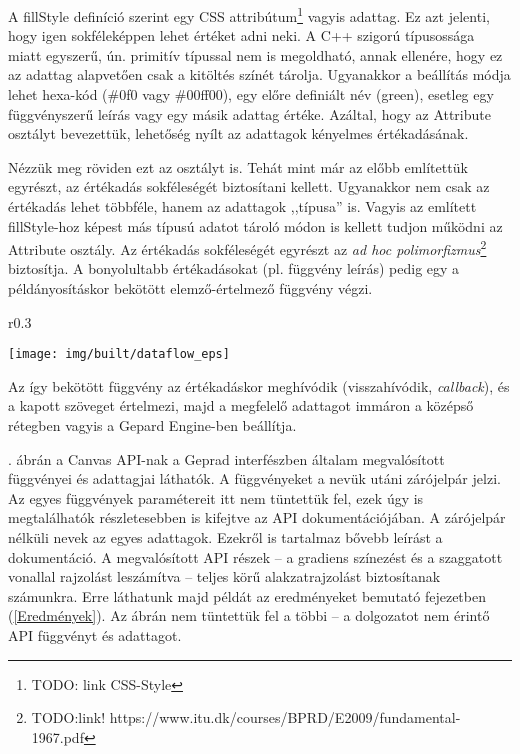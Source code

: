 \documentclass[12pt]{report}
\theoremstyle{definition}
\newcommand{\inenglish}[1]{\textsl{#1}}
\newcommand{\func}[1]{{\textsf{\footnotesize{#1}}}}
\newcommand{\melyikoldalra}{r}
\begin{document}
A \func{fillStyle} definíció szerint egy CSS attribútum\footnote{TODO: link
CSS-Style} vagyis adattag. Ez azt jelenti, hogy igen sokféleképpen lehet
értéket adni neki. A C++ szigorú típusossága miatt egyszerű, ún. primitív
típussal nem is megoldható, annak ellenére, hogy ez az adattag alapvetően csak
a kitöltés színét tárolja. Ugyanakkor a beállítás módja lehet hexa-kód
(\func{\#0f0} vagy \func{\#00ff00}), egy előre definiált név (\func{green}),
esetleg egy függvényszerű leírás vagy egy másik adattag értéke. Azáltal, hogy
az \func{Attribute} osztályt bevezettük, lehetőség nyílt az adattagok kényelmes
értékadásának.

Nézzük meg röviden ezt az osztályt is. Tehát mint már az előbb említettük
egyrészt, az értékadás sokféleségét biztosítani kellett. Ugyanakkor nem csak az
értékadás lehet többféle, hanem az adattagok ,,típusa'' is. Vagyis az említett
\func{fillStyle}-hoz képest más típusú adatot tároló módon is kellett tudjon
működni az \func{Attribute} osztály. Az értékadás sokféleségét egyrészt az
\emph{ad hoc polimorfizmus}\footnote{TODO:link!
https://www.itu.dk/courses/BPRD/E2009/fundamental-1967.pdf} biztosítja. A
bonyolultabb értékadásokat (pl. függvény leírás) pedig egy a példányosításkor
bekötött elemző-értelmező függvény végzi.
  \begin{wrapfigure}{\melyikoldalra}{0.3\textwidth}
  \begin{center}
    \texttt{[image: img/built/dataflow\_eps]}
  \end{center}
    \caption{\label{dataflow-API-diagram} A \emph{felső} réteg, vagyis
    a Gepard interfész függvényei és adattagjai}
  \end{wrapfigure}
Az így bekötött függvény az értékadáskor meghívódik (visszahívódik,
\inenglish{callback}), és a kapott szöveget értelmezi, majd a megfelelő
adattagot immáron a középső rétegben vagyis a \func{Gepard Engine}-ben
beállítja.

. ábrán a Canvas API-nak a Geprad interfészben
általam megvalósított függvényei és adattagjai láthatók. A függvényeket a nevük
utáni zárójelpár jelzi. Az egyes függvények paramétereit itt nem tüntettük fel,
ezek úgy is megtalálhatók részletesebben is kifejtve az API dokumentációjában.
A zárójelpár nélküli nevek az egyes adattagok. Ezekről is tartalmaz bővebb
leírást a dokumentáció. A megvalósított API részek -- a gradiens színezést és a
szaggatott vonallal rajzolást leszámítva -- teljes körű alakzatrajzolást
biztosítanak számunkra. Erre láthatunk majd példát az eredményeket bemutató
fejezetben (\ref{Eredmények}). Az ábrán nem tüntettük fel a többi -- a
dolgozatot nem érintő API függvényt és adattagot.
\end{document}
